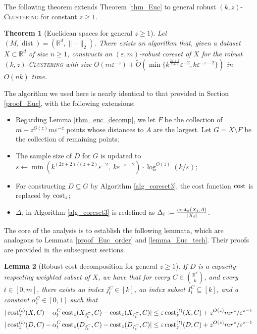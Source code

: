 \documentclass[11pt,letterpaper]{article}
\newtheorem{theorem}{Theorem}[section]
\newtheorem{lemma}[theorem]{Lemma}
\theoremstyle{definition}
\newcommand{\eps}{\varepsilon}
\newcommand{\ProblemName}[1]{\textsc{#1}}
\newcommand{\kzC}{\ProblemName{$(k, z)$-Clustering}\xspace}
\DeclareMathOperator{\dist}{dist}
\begin{document}
The following theorem extends Theorem \ref{thm_Euc} to general robust \kzC for constant $z\geq 1$.

\begin{theorem}[Euclidean spaces for general $z\geq 1$] \label{thm_Euc_kzC}
Let $(M,\dist)=(\mathbb{R}^d,\|\cdot\|_2)$. 
%
There exists an algorithm that, given a dataset $X\subset \mathbb{R}^d$ of size $n\geq 1$, constructs an $(\eps,m)$-robust coreset of 
$X$ for the robust \kzC with size $O(m \eps^{-z})+\tilde{O}(\min\{k^{\frac{2z+2}{z+2}}\eps^{-2}, k\eps^{-z-2}\})$ in $O(nk)$ time.
%
\end{theorem}

%
The algorithm we used here is nearly identical to that provided in Section \ref{proof_Euc}, with the following extensions:
\begin{itemize}[itemsep=0pt]
\item Regarding Lemma \ref{thm_euc_decomp}, we let $F$ be the collection of $m + z^{O(z)} m\eps^{-z}$ points whose distances to $A$ are the largest.
%
Let $G = X\setminus F$ be the collection of remaining points;
%
\item The sample size of $D$ for $G$ is updated to \( s \leftarrow \min(k^{(2z+2)/(z+2)} \eps^{-2},\; k \eps^{-z-2}) \cdot \log^{O(1)}(k/\eps) \);  
%
\item For constructing $D\subseteq G$ by Algorithm \ref{alg_coreset3}, the cost function \( \cost \) is replaced by \( \cost_z \);  
%
\item \( \Delta_i \) in Algorithm \ref{alg_coreset3} is redefined as \( \Delta_i := \frac{\cost_z(X_i, A)}{|X_i|} \).
\end{itemize}

%
The core of the analysis is to establish the following lemmata, which are analogous to Lemmata \ref{proof_Euc_order} and \ref{lemma_Euc_tech}.  
%
Their proofs are provided in the subsequent sections.

\begin{lemma}[Robust cost decomposition for general $z\geq 1$]
\label{lemma_Euc_order_kzC} 
If $D$ is a capacity-respecting weighted subset of $X$, we have that for every $C\in \binom{\mathbb{R}^d}{k}$, and every $t\in [0,m]$, there exists an index $j_t^C\in [k]$, an index subset $I_t^C\subseteq [k]$, and a constant $\alpha_t^C\in [0,1]$ such that
	\begin{gather*} 
		|\cost^{(t)}_z(X,C)- \alpha_t^C\cost_z(X_{j_t^C},C)-\cost_z(X_{I_t^C},C)|\leq \eps \cost^{(t)}_z(X,C) +  z^{O(z)} mr^z/\eps^{z-1}  \\
		|\cost^{(t)}_z(D,C)- \alpha_t^C\cost_z(D_{j_t^C},C)-\cost_z(D_{I_t^C},C)|\leq \eps \cost^{(t)}_z(D,C) +  z^{O(z)} mr^z/\eps^{z-1}
	\end{gather*}
\end{lemma}
\end{document}
